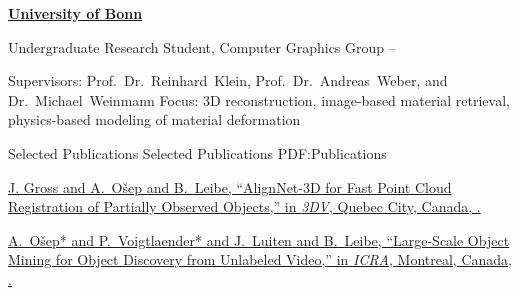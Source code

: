 \documentclass[letterpaper,MMMyyyy,nonstopmode]{simpleresumecv}
\begin{document}
\begin{Body}
\Gap
\Entry
\href{https://www.uni-bonn.de/}
{\textbf{University of Bonn}}
%

\Gap
\BulletItem
Undergraduate Research Student, Computer Graphics Group
\hfill
{} --
\begin{Detail}
\SubBulletItem
Supervisors: 
Prof.~Dr.~Reinhard~Klein, 
Prof.~Dr.~Andreas~Weber, and 
Dr.~Michael~Weinmann
\SubBulletItem
Focus:
3D reconstruction, image-based material retrieval, physics-based modeling of material deformation
\end{Detail}


\Section
{Selected Publications}
{Selected Publications}
{PDF:Publications}

%
%
%
\begingroup
\Gap
\href{https://arxiv.org/abs/1712.08832}
{J. Gross and \underline{A.~O\v{s}ep} and B.~Leibe,
``AlignNet-3D for Fast Point Cloud Registration of Partially Observed Objects,''
in \textit{3DV},
Quebec City, Canada,
.}

\Gap
\href{https://www.vision.rwth-aachen.de/media/papers/189/gross_3dv_2019.pdf}
{\underline{A.~O\v{s}ep}* and P.~Voigtlaender* and J.~Luiten and B.~Leibe,
``Large-Scale Object Mining for Object Discovery from Unlabeled Video,''
in \textit{ICRA},
Montreal, Canada,
.}


\end{Body}
\end{document}
